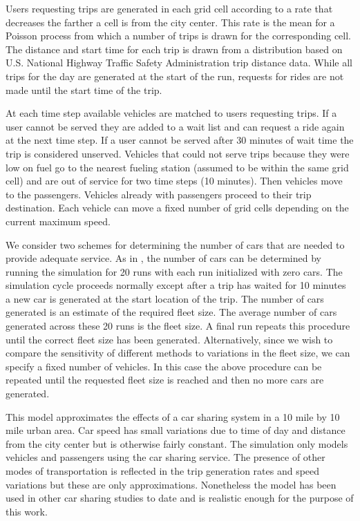 \documentclass[letterpaper]{article}
\begin{document}
Users requesting trips are generated in each grid cell according to a rate that decreases the farther a cell is from the city center. This rate is the mean for a Poisson process from which a number of trips is drawn for the corresponding cell. The distance and start time for each trip is drawn from a distribution based on U.S. National Highway Traffic Safety Administration trip distance data. While all trips for the day are generated at the start of the run, requests for rides are not made until the start time of the trip. 

At each time step available vehicles are matched to users requesting trips. If a user cannot be served they are added to a wait list and can request a ride again at the next time step. If a user cannot be served after 30 minutes of wait time the trip is considered unserved. Vehicles that could not serve trips because they were low on fuel go to the nearest fueling station (assumed to be within the same grid cell) and are out of service for two time steps (10 minutes). Then vehicles move to the passengers. Vehicles already with passengers proceed to their trip destination. Each vehicle can move a fixed number of grid cells depending on the current maximum speed.

We consider two schemes for determining the number of cars that are needed to provide adequate service. As in \cite{fagnant2014travel}, the number of cars can be determined by running the simulation for 20 runs with each run initialized with zero cars. The simulation cycle proceeds normally except after a trip has waited for 10 minutes a new car is generated at the start location of the trip. The number of cars generated is an estimate of the required fleet size. The average number of cars generated across these 20 runs is the fleet size. A final run repeats this procedure until the correct fleet size has been generated. Alternatively, since we wish to compare the sensitivity of different methods to variations in the fleet size, we can specify a fixed number of vehicles. In this case the above procedure can be repeated until the requested fleet size is reached and then no more cars are generated.

This model approximates the effects of a car sharing system in a 10 mile by 10 mile urban area. Car speed has small variations due to time of day and distance from the city center but is otherwise fairly constant. The simulation only models vehicles and passengers using the car sharing service. The presence of other modes of transportation is reflected in the trip generation rates and speed variations but these are only approximations. Nonetheless the model has been used in other car sharing studies \cite{fagnant2015operations} to date and is realistic enough for the purpose of this work. 
\end{document}
